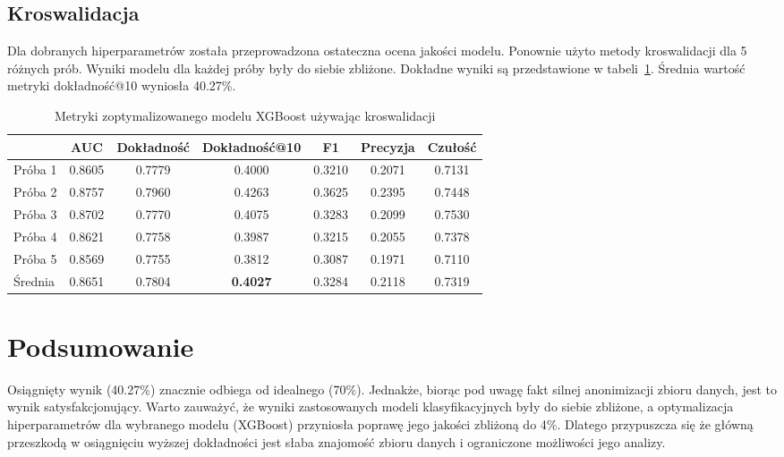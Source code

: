\documentclass[a4paper,12pt]{article}
\begin{document}
    \subsection{Kroswalidacja}
    Dla dobranych hiperparametrów została przeprowadzona ostateczna ocena jakości modelu.
    Ponownie użyto metody kroswalidacji dla 5 różnych prób.
    Wyniki modelu dla każdej próby były do siebie zbliżone.
    Dokładne wyniki są przedstawione w tabeli~\ref{tab:xgb-score-comparison}.
    Średnia wartość metryki dokładność@10 wyniosła 40.27\%.


    \begin{table}
        \begin{tabular}{l|*{6}{c}}
            & AUC & Dokładność & Dokładność@10 & F1 & Precyzja & Czułość \\
            \hline
            Próba 1 & 0.8605 & 0.7779 & 0.4000 & 0.3210 & 0.2071 & 0.7131 \\
            Próba 2 & 0.8757 & 0.7960 & 0.4263 & 0.3625 & 0.2395 & 0.7448 \\
            Próba 3 & 0.8702 & 0.7770 & 0.4075 & 0.3283 & 0.2099 & 0.7530 \\
            Próba 4 & 0.8621 & 0.7758 & 0.3987 & 0.3215 & 0.2055 & 0.7378 \\
            Próba 5 & 0.8569 & 0.7755 & 0.3812 & 0.3087 & 0.1971 & 0.7110 \\
            \hline
            Średnia & 0.8651 & 0.7804 & \textbf{0.4027} & 0.3284 & 0.2118 & 0.7319 \\
        \end{tabular}
        \caption{Metryki zoptymalizowanego modelu XGBoost używając kroswalidacji}
        \label{tab:xgb-score-comparison}
    \end{table}

    \section{Podsumowanie}
    Osiągnięty wynik (40.27\%) znacznie odbiega od idealnego (70\%).
    Jednakże, biorąc pod uwagę fakt silnej anonimizacji zbioru danych, jest to wynik satysfakcjonujący.
    Warto zauważyć, że wyniki zastosowanych modeli klasyfikacyjnych były do siebie zbliżone, a optymalizacja hiperparametrów dla wybranego modelu (XGBoost) przyniosła poprawę jego jakości zbliżoną do 4\%.
    Dlatego przypuszcza się że główną przeszkodą w osiągnięciu wyższej dokładności jest słaba znajomość zbioru danych i ograniczone możliwości jego analizy.

    \newpage
    
    
\end{document}
